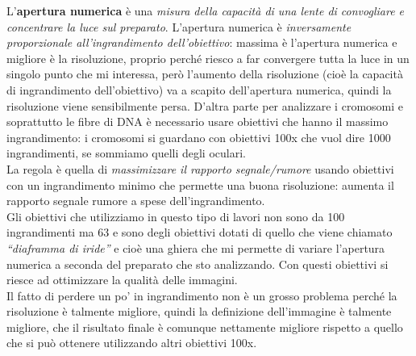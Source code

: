 \documentclass[11pt]{book}
\begin{document}
L’\textbf{apertura numerica} è una \emph{misura della capacità di una lente di convogliare e concentrare la luce sul preparato}. L’apertura numerica è \emph{inversamente proporzionale all’ingrandimento dell’obiettivo}: massima è l’apertura numerica e migliore è la risoluzione, proprio perché riesco a far convergere tutta la luce in un singolo punto che mi interessa, però l’aumento della risoluzione (cioè la capacità di ingrandimento dell’obiettivo) va a scapito dell’apertura numerica, quindi la risoluzione viene sensibilmente persa. D’altra parte per analizzare i cromosomi e soprattutto le fibre di DNA è necessario usare obiettivi che hanno il massimo ingrandimento: i cromosomi si guardano con obiettivi 100x che vuol dire 1000 ingrandimenti, se sommiamo quelli degli oculari.\\
La regola è quella di \emph{massimizzare il rapporto segnale/rumore} usando obiettivi con un ingrandimento minimo che permette una buona risoluzione: aumenta il rapporto segnale rumore a spese dell’ingrandimento.\\
Gli obiettivi che utilizziamo in questo tipo di lavori non sono da 100 ingrandimenti ma 63 e sono degli obiettivi dotati di quello che viene chiamato \emph{``diaframma di iride''} e cioè una ghiera che mi permette di variare l’apertura numerica a seconda del preparato che sto analizzando.
Con questi obiettivi si riesce ad ottimizzare la qualità delle immagini.\\
Il fatto di perdere un po’ in ingrandimento non è un grosso problema perché la risoluzione è talmente migliore, quindi la definizione dell’immagine è talmente migliore, che il risultato finale è comunque nettamente migliore rispetto a quello che si può ottenere utilizzando altri obiettivi 100x.
\end{document}
